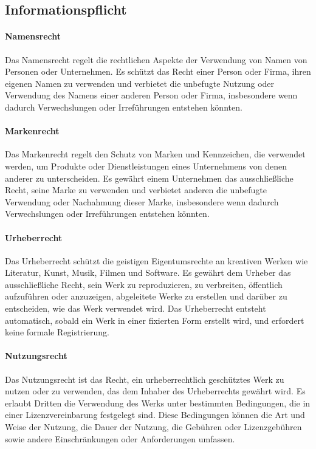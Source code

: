 \subsection{Informationspflicht}
\label{sec:Informationspflicht}

\paragraph{Namensrecht}

Das Namensrecht regelt die rechtlichen Aspekte der Verwendung von Namen von Personen oder Unternehmen. Es schützt das Recht einer Person oder Firma, ihren eigenen Namen zu verwenden und verbietet die unbefugte Nutzung oder Verwendung des Namens einer anderen Person oder Firma, insbesondere wenn dadurch Verwechslungen oder Irreführungen entstehen könnten.

\paragraph{Markenrecht}

Das Markenrecht regelt den Schutz von Marken und Kennzeichen, die verwendet werden, um Produkte oder Dienstleistungen eines Unternehmens von denen anderer zu unterscheiden. Es gewährt einem Unternehmen das ausschließliche Recht, seine Marke zu verwenden und verbietet anderen die unbefugte Verwendung oder Nachahmung dieser Marke, insbesondere wenn dadurch Verwechslungen oder Irreführungen entstehen könnten.

\paragraph{Urheberrecht}

Das Urheberrecht schützt die geistigen Eigentumsrechte an kreativen Werken wie Literatur, Kunst, Musik, Filmen und Software. Es gewährt dem Urheber das ausschließliche Recht, sein Werk zu reproduzieren, zu verbreiten, öffentlich aufzuführen oder anzuzeigen, abgeleitete Werke zu erstellen und darüber zu entscheiden, wie das Werk verwendet wird. Das Urheberrecht entsteht automatisch, sobald ein Werk in einer fixierten Form erstellt wird, und erfordert keine formale Registrierung.

\paragraph{Nutzungsrecht}

Das Nutzungsrecht ist das Recht, ein urheberrechtlich geschütztes Werk zu nutzen oder zu verwenden, das dem Inhaber des Urheberrechts gewährt wird. Es erlaubt Dritten die Verwendung des Werks unter bestimmten Bedingungen, die in einer Lizenzvereinbarung festgelegt sind. Diese Bedingungen können die Art und Weise der Nutzung, die Dauer der Nutzung, die Gebühren oder Lizenzgebühren sowie andere Einschränkungen oder Anforderungen umfassen.

